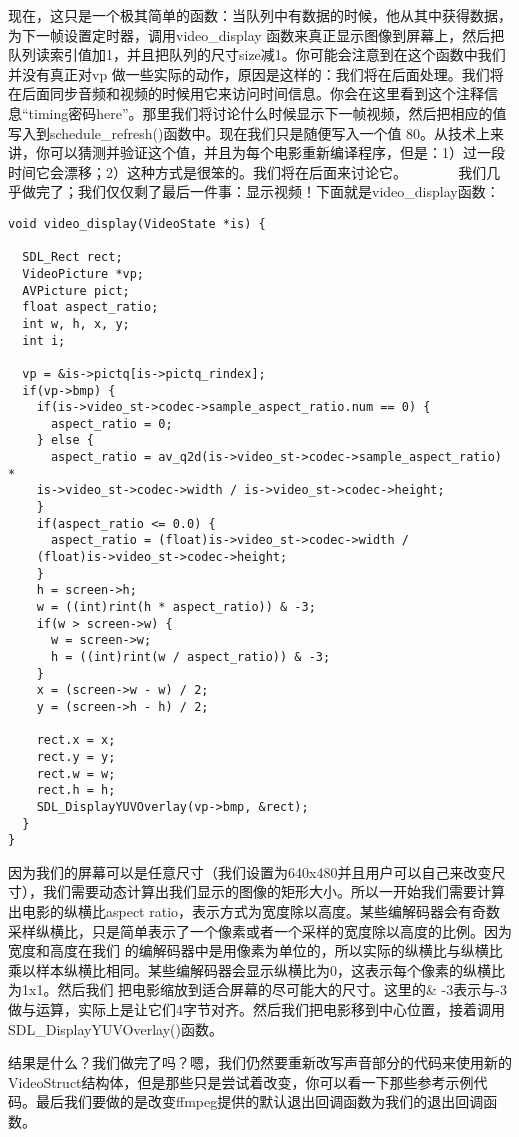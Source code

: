 现在，这只是一个极其简单的函数：当队列中有数据的时候，他从其中获得数据，为下一帧设置定时器，调用video_display 函数来真正显示图像到屏幕上，然后把队列读索引值加1，并且把队列的尺寸size减1。你可能会注意到在这个函数中我们并没有真正对vp 做一些实际的动作，原因是这样的：我们将在后面处理。我们将在后面同步音频和视频的时候用它来访问时间信息。你会在这里看到这个注释信息“timing密码here”。那里我们将讨论什么时候显示下一帧视频，然后把相应的值写入到schedule_refresh()函数中。现在我们只是随便写入一个值 80。从技术上来讲，你可以猜测并验证这个值，并且为每个电影重新编译程序，但是：1）过一段时间它会漂移；2）这种方式是很笨的。我们将在后面来讨论它。
　　　
我们几乎做完了；我们仅仅剩了最后一件事：显示视频！下面就是video_display函数：
\begin{lstlisting}
void video_display(VideoState *is) {

  SDL_Rect rect;
  VideoPicture *vp;
  AVPicture pict;
  float aspect_ratio;
  int w, h, x, y;
  int i;

  vp = &is->pictq[is->pictq_rindex];
  if(vp->bmp) {
    if(is->video_st->codec->sample_aspect_ratio.num == 0) {
      aspect_ratio = 0;
    } else {
      aspect_ratio = av_q2d(is->video_st->codec->sample_aspect_ratio) *
    is->video_st->codec->width / is->video_st->codec->height;
    }
    if(aspect_ratio <= 0.0) {
      aspect_ratio = (float)is->video_st->codec->width /
    (float)is->video_st->codec->height;
    }
    h = screen->h;
    w = ((int)rint(h * aspect_ratio)) & -3;
    if(w > screen->w) {
      w = screen->w;
      h = ((int)rint(w / aspect_ratio)) & -3;
    }
    x = (screen->w - w) / 2;
    y = (screen->h - h) / 2;

    rect.x = x;
    rect.y = y;
    rect.w = w;
    rect.h = h;
    SDL_DisplayYUVOverlay(vp->bmp, &rect);
  }
}
\end{lstlisting}

因为我们的屏幕可以是任意尺寸（我们设置为640x480并且用户可以自己来改变尺寸），我们需要动态计算出我们显示的图像的矩形大小。所以一开始我们需要计算出电影的纵横比aspect ratio，表示方式为宽度除以高度。某些编解码器会有奇数采样纵横比，只是简单表示了一个像素或者一个采样的宽度除以高度的比例。因为宽度和高度在我们 的编解码器中是用像素为单位的，所以实际的纵横比与纵横比乘以样本纵横比相同。某些编解码器会显示纵横比为0，这表示每个像素的纵横比为1x1。然后我们 把电影缩放到适合屏幕的尽可能大的尺寸。这里的\& -3表示与-3做与运算，实际上是让它们4字节对齐。然后我们把电影移到中心位置，接着调用SDL_DisplayYUVOverlay()函数。

结果是什么？我们做完了吗？嗯，我们仍然要重新改写声音部分的代码来使用新的VideoStruct结构体，但是那些只是尝试着改变，你可以看一下那些参考示例代码。最后我们要做的是改变ffmpeg提供的默认退出回调函数为我们的退出回调函数。

